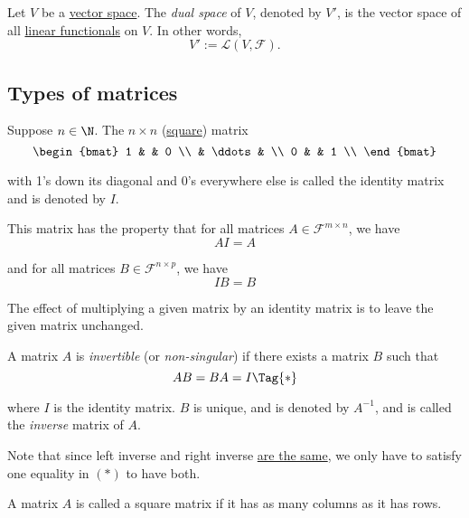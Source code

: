 \label{c6cc6ea}

Let $V$ be a \href{fc83050}{vector space}. The \textit{dual space} of $V$,
denoted by $V'$, is the vector space of all \href{b0b1db8}{linear functionals}
on $V$. In other words,
$$
  V':=\mathcal L(V,\mathcal F).
$$

\subsection{Types of matrices}\label{c06426e}

\label{dcfd9cd}

Suppose $n\in\N$. The $n\times n$ (\href{d917f93}{square}) matrix
$$
  \begin{bmat}
    1 &        & 0 \\
      & \ddots &   \\
    0 &        & 1 \\
  \end{bmat}
$$

with 1's down its diagonal and 0's everywhere else is called the identity
matrix and is denoted by $I$.

This matrix has the property that for all matrices $A\in\mathcal F^{m\times
n}$, we have
$$
  AI=A
$$

and for all matrices $B\in\mathcal F^{n\times p}$, we have
$$
  IB=B
$$

The effect of multiplying a given matrix by an identity matrix is to leave the
given matrix unchanged.

\label{ce4daa8}

A matrix $A$ is \textit{invertible} (or \textit{non-singular}) if there exists
a matrix $B$ such that
\begin{equation*}
  AB=BA=I\Tag{*}
\end{equation*}

where $I$ is the identity matrix. $B$ is unique, and is denoted by $A^{-1}$,
and is called the \textit{inverse} matrix of $A$.

Note that since left inverse and right inverse \href{d0f9377}{are the same}, we
only have to satisfy one equality in $(*)$ to have both.

\label{d917f93}

A matrix $A$ is called a square matrix if it has as many columns as it has
rows.

\label{adcfa41}

